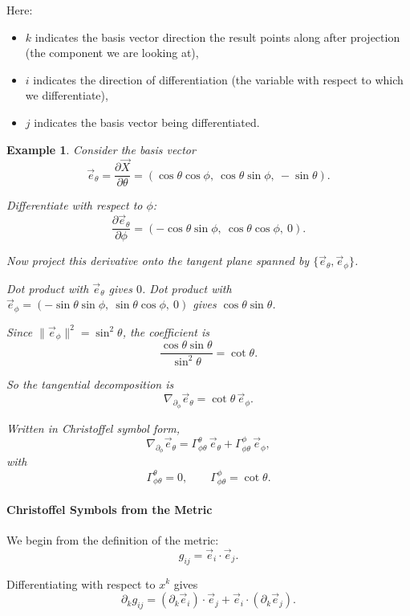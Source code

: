 \documentclass{article}
\newtheorem{example}{Example}
\begin{document}
Here:
\begin{itemize}
  \item $k$ indicates the basis vector direction the result points along after projection (the component we are looking at),
  \item $i$ indicates the direction of differentiation (the variable with respect to which we differentiate),
  \item $j$ indicates the basis vector being differentiated.
\end{itemize}

\begin{example}
Consider the basis vector
\[
\vec{e}_\theta = \frac{\partial \vec{X}}{\partial \theta} 
= (\cos\theta \cos\phi,\ \cos\theta \sin\phi,\ -\sin\theta).
\]

Differentiate with respect to $\phi$:
\[
\frac{\partial \vec{e}_\theta}{\partial \phi} 
= (-\cos\theta \sin\phi,\ \cos\theta \cos\phi,\ 0).
\]


Now project this derivative onto the tangent plane spanned by 
$\{\vec{e}_\theta, \vec{e}_\phi\}$.

Dot product with $\vec{e}_\theta$ gives $0$.
Dot product with $\vec{e}_\phi = (-\sin\theta \sin\phi,\ \sin\theta \cos\phi,\ 0)$ gives $\cos\theta \sin\theta$.

Since $\|\vec{e}_\phi\|^2 = \sin^2\theta$, the coefficient is
\[
\frac{\cos\theta \sin\theta}{\sin^2\theta} = \cot\theta.
\]

So the tangential decomposition is
\[
\nabla_{\partial_\phi}\vec{e}_\theta = \cot\theta\, \vec{e}_\phi.
\]

Written in Christoffel symbol form,
\[
\nabla_{\partial_\phi}\vec{e}_\theta 
= \Gamma^\theta_{\phi\theta}\,\vec{e}_\theta 
+ \Gamma^\phi_{\phi\theta}\,\vec{e}_\phi,
\]
with
\[
\Gamma^\theta_{\phi\theta} = 0,
\qquad
\Gamma^\phi_{\phi\theta} = \cot\theta.
\]

\end{example}


\paragraph{Christoffel Symbols from the Metric}

We begin from the definition of the metric:
\[
g_{ij} = \vec e_i \cdot \vec e_j.
\]

Differentiating with respect to $x^k$ gives
\[
\partial_k g_{ij}
= (\partial_k \vec e_i)\cdot \vec e_j
+ \vec e_i \cdot (\partial_k \vec e_j).
\]
\end{document}
